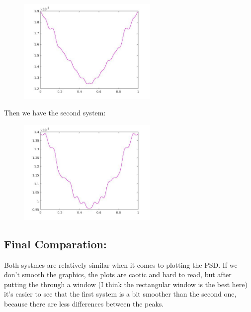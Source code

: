 \documentclass[a4paper,11pt]{article}
\begin{document}
\begin{figure}[!hp]
    \begin{center}
    \includegraphics[width=0.6\textwidth]{images/lab4_31.jpg}
    \end{center}
\end{figure}

Then we have the second system:

\begin{figure}[!hp]
    \begin{center}
    \includegraphics[width=0.6\textwidth]{images/lab4_41.jpg}
    \end{center}
\end{figure}

\newpage

\subsection{Final Comparation:}

Both systmes are relatively similar when it comes to plotting the PSD. If we don't smooth the graphics, the plots are caotic and hard to read, but after putting the through a window (I think the rectangular window is the best here) it's easier to see that the first system is a bit smoother than the second one, because there are less differences between the peaks. 

\vspace{4cm}
\end{document}
